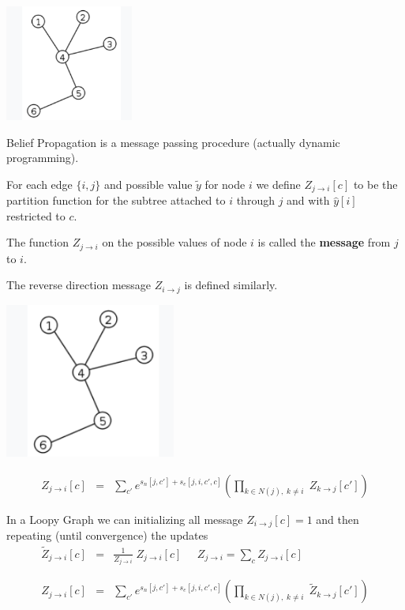 {

\centerline{\includegraphics[height=1.5in]{../images/Tree}}

\vfill
Belief Propagation is a message passing procedure (actually dynamic programming).

\vfill
For each edge $\{i,j\}$ and possible value $\tilde{y}$ for node $i$ we define {\color{red} $Z_{j \rightarrow i}[c]$}
to be  the partition function for the subtree attached to $i$ through $j$ and
with $\hat{y}[i]$ restricted to $c$.

\vfill
The function $Z_{j \rightarrow i}$ on the possible values of node $i$ is called the {\bf message} from $j$ to $i$.

\vfill
The reverse direction message $Z_{i \rightarrow j}$ is defined similarly.


\centerline{\includegraphics[height=2.0in]{../images/Tree}}

\vfill
\begin{eqnarray*}
  Z_{j\rightarrow i}[c] & = & \sum_{c'}  e^{s_n[j,c'] + s_e[j,i,c',c]}
    \left(\prod_{k \in N(j),\;k \not = i}\;Z_{k\rightarrow j}[c']\right)
\end{eqnarray*}


In a Loopy Graph we can initializing all message $Z_{i \rightarrow j}[c] = 1$ and then repeating (until convergence) the updates
\vfill
\begin{eqnarray*}
  \tilde{Z}_{j \rightarrow i}[c] & = & \frac{1}{Z_{j \rightarrow i}}\;Z_{j \rightarrow i}[c] \;\;\;\;\;Z_{j \rightarrow i} = \sum_{c} Z_{j \rightarrow i}[c] \\
  \\
  \\
  Z_{j\rightarrow i}[c] & = & \sum_{c'}  e^{s_n[j,c'] + s_e[j,i,c',c]}
    \left(\prod_{k \in N(j),\;k \not = i}\;\tilde{Z}_{k\rightarrow j}[c']\right)
\end{eqnarray*}

}
